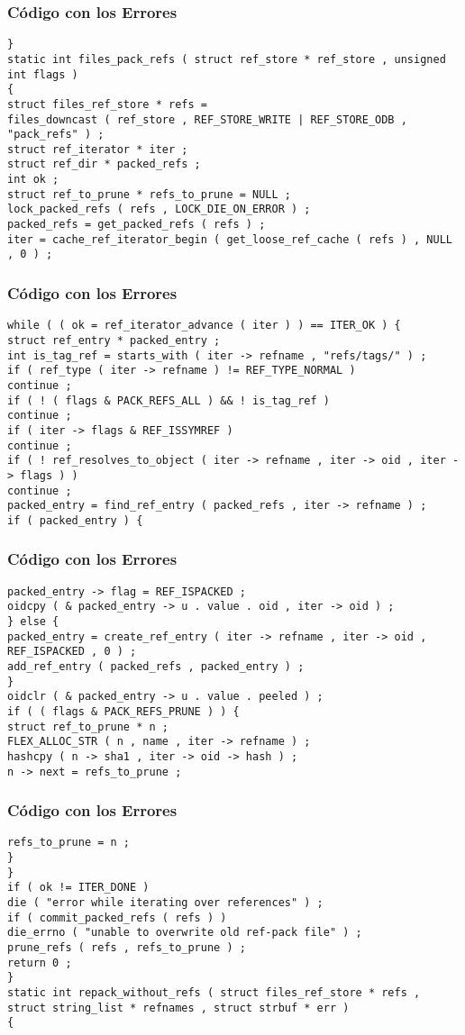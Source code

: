 \documentclass{beamer}
\begin{document}
\begin{frame}[fragile]
\frametitle{C\'odigo con los Errores}
\begin{verbatim}
} 
static int files_pack_refs ( struct ref_store * ref_store , unsigned int flags ) 
{ 
struct files_ref_store * refs = 
files_downcast ( ref_store , REF_STORE_WRITE | REF_STORE_ODB , 
"pack_refs" ) ; 
struct ref_iterator * iter ; 
struct ref_dir * packed_refs ; 
int ok ; 
struct ref_to_prune * refs_to_prune = NULL ; 
lock_packed_refs ( refs , LOCK_DIE_ON_ERROR ) ; 
packed_refs = get_packed_refs ( refs ) ; 
iter = cache_ref_iterator_begin ( get_loose_ref_cache ( refs ) , NULL , 0 ) ; 
\end{verbatim}
\end{frame}
\begin{frame}[fragile]
\frametitle{C\'odigo con los Errores}
\begin{verbatim}
while ( ( ok = ref_iterator_advance ( iter ) ) == ITER_OK ) { 
struct ref_entry * packed_entry ; 
int is_tag_ref = starts_with ( iter -> refname , "refs/tags/" ) ; 
if ( ref_type ( iter -> refname ) != REF_TYPE_NORMAL ) 
continue ; 
if ( ! ( flags & PACK_REFS_ALL ) && ! is_tag_ref ) 
continue ; 
if ( iter -> flags & REF_ISSYMREF ) 
continue ; 
if ( ! ref_resolves_to_object ( iter -> refname , iter -> oid , iter -> flags ) ) 
continue ; 
packed_entry = find_ref_entry ( packed_refs , iter -> refname ) ; 
if ( packed_entry ) { 
\end{verbatim}
\end{frame}
\begin{frame}[fragile]
\frametitle{C\'odigo con los Errores}
\begin{verbatim}
packed_entry -> flag = REF_ISPACKED ; 
oidcpy ( & packed_entry -> u . value . oid , iter -> oid ) ; 
} else { 
packed_entry = create_ref_entry ( iter -> refname , iter -> oid , 
REF_ISPACKED , 0 ) ; 
add_ref_entry ( packed_refs , packed_entry ) ; 
} 
oidclr ( & packed_entry -> u . value . peeled ) ; 
if ( ( flags & PACK_REFS_PRUNE ) ) { 
struct ref_to_prune * n ; 
FLEX_ALLOC_STR ( n , name , iter -> refname ) ; 
hashcpy ( n -> sha1 , iter -> oid -> hash ) ; 
n -> next = refs_to_prune ; 
\end{verbatim}
\end{frame}
\begin{frame}[fragile]
\frametitle{C\'odigo con los Errores}
\begin{verbatim}
refs_to_prune = n ; 
} 
} 
if ( ok != ITER_DONE ) 
die ( "error while iterating over references" ) ; 
if ( commit_packed_refs ( refs ) ) 
die_errno ( "unable to overwrite old ref-pack file" ) ; 
prune_refs ( refs , refs_to_prune ) ; 
return 0 ; 
} 
static int repack_without_refs ( struct files_ref_store * refs , 
struct string_list * refnames , struct strbuf * err ) 
{ 
\end{verbatim}
\end{frame}
\end{document}
